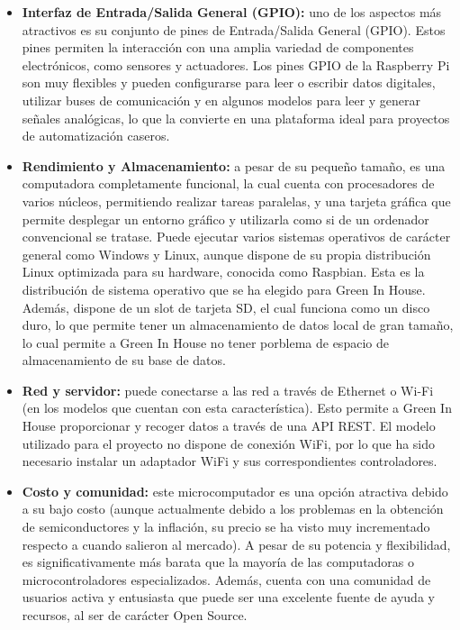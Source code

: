 \begin{itemize}
    \item \textbf{Interfaz de Entrada/Salida General (GPIO):} uno de los aspectos más atractivos es su conjunto de pines de Entrada/Salida General (GPIO). Estos pines permiten la interacción con una amplia variedad de componentes electrónicos, como sensores y actuadores. Los pines GPIO de la Raspberry Pi son muy flexibles y pueden configurarse para leer o escribir datos digitales, utilizar buses de comunicación y en algunos modelos para leer y generar señales analógicas, lo que la convierte en una plataforma ideal para proyectos de automatización caseros.
    \item \textbf{Rendimiento y Almacenamiento:} a pesar de su pequeño tamaño, es una computadora completamente funcional, la cual cuenta con procesadores de varios núcleos, permitiendo realizar tareas paralelas, y una tarjeta gráfica que permite desplegar un entorno gráfico y utilizarla como si de un ordenador convencional se tratase. Puede ejecutar varios sistemas operativos de carácter general como Windows y Linux, aunque dispone de su propia distribución Linux optimizada para su hardware, conocida como Raspbian. Esta es la distribución de sistema operativo que se ha elegido para Green In House. Además, dispone de un slot de tarjeta SD, el cual funciona como un disco duro, lo que permite tener un almacenamiento de datos local de gran tamaño, lo cual permite a Green In House no tener porblema de espacio de almacenamiento de su base de datos.
    \item \textbf{Red y servidor:} puede conectarse a las red a través de Ethernet o Wi-Fi (en los modelos que cuentan con esta característica). Esto permite a Green In House proporcionar y recoger datos a través de una API REST. El modelo utilizado para el proyecto no dispone de conexión WiFi, por lo que ha sido necesario instalar un adaptador WiFi y sus correspondientes controladores.
    \item \textbf{Costo y comunidad:} este microcomputador es una opción atractiva debido a su bajo costo (aunque actualmente debido a los problemas en la obtención de semiconductores y la inflación, su precio se ha visto muy incrementado respecto a cuando salieron al mercado). A pesar de su potencia y flexibilidad, es significativamente más barata que la mayoría de las computadoras o microcontroladores especializados. Además, cuenta con una comunidad de usuarios activa y entusiasta que puede ser una excelente fuente de ayuda y recursos, al ser de carácter Open Source.
\end{itemize}

